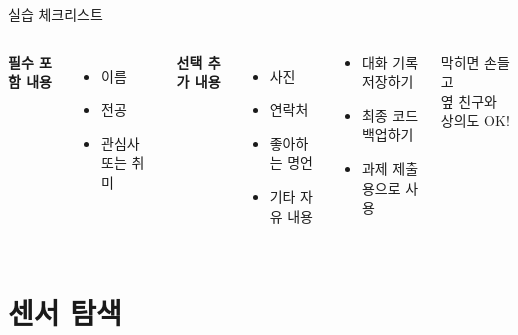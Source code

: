\documentclass[aspectratio=169]{beamer}
\begin{document}
\begin{frame}{실습 체크리스트}
  \begin{columns}
    \textbf{필수 포함 내용}
    \begin{itemize}
      \item[✅] 이름
      \item[✅] 전공
      \item[✅] 관심사 또는 취미
    \end{itemize}
    
    \vspace{1em}
    \textbf{선택 추가 내용}
    \begin{itemize}
      \item[○] 사진
      \item[○] 연락처
      \item[○] 좋아하는 명언
      \item[○] 기타 자유 내용
    \end{itemize}
    
    \begin{tcolorbox}[title=⚠️ 주의]
      \begin{itemize}
        \item 대화 기록 저장하기
        \item 최종 코드 백업하기
        \item 과제 제출용으로 사용
      \end{itemize}
    \end{tcolorbox}
    
    \vspace{0.5em}
    
    \begin{tcolorbox}[colframe=accentgreen, title=💡 팁]
      막히면 손들고\\
      옆 친구와 상의도 OK!
    \end{tcolorbox}
  \end{columns}
\end{frame}

\section{센서 탐색}
\end{document}
